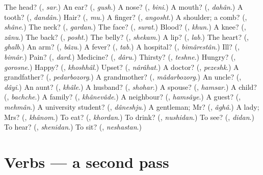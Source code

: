 \begin{tcolorbox}[breakable,colback=teal!4,colframe=teal!35!black,title={Before you move on}]
The head? (\textbf{}, \emph{sar}.) An ear? (\textbf{}, \emph{gush}.) A nose? (\textbf{}, \emph{bini}.) A mouth? (\textbf{}, \emph{dahân}.) A tooth? (\textbf{}, \emph{dandân}.) Hair? (\textbf{}, \emph{mu}.) A finger? (\textbf{}, \emph{angosht}.) A shoulder; a comb? (\textbf{}, \emph{shâne}.) The neck? (\textbf{}, \emph{gardan}.) The face? (\textbf{}, \emph{surat}.) Blood? (\textbf{}, \emph{khun}.) A knee? (\textbf{}, \emph{zânu}.) The back? (\textbf{}, \emph{posht}.) The belly? (\textbf{}, \emph{shekam}.) A lip? (\textbf{}, \emph{lab}.) The heart? (\textbf{}, \emph{ghalb}.) An arm? (\textbf{}, \emph{bâzu}.) A fever? (\textbf{}, \emph{tab}.) A hospital? (\textbf{}, \emph{bimârestân}.) Ill? (\textbf{}, \emph{bimâr}.) Pain? (\textbf{}, \emph{dard}.) Medicine? (\textbf{}, \emph{dâru}.) Thirsty? (\textbf{}, \emph{teshne}.) Hungry? (\textbf{}, \emph{gorosne}.) Happy? (\textbf{}, \emph{khoshhâl}.) Upset? (\textbf{}, \emph{nârâhat}.) A doctor? (\textbf{}, \emph{pezeshk}.) A grandfather? (\textbf{}, \emph{pedarbozorg}.) A grandmother? (\textbf{}, \emph{mâdarbozorg}.) An uncle? (\textbf{}, \emph{dâyi}.) An aunt? (\textbf{}, \emph{khâle}.) A husband? (\textbf{}, \emph{shohar}.) A spouse? (\textbf{}, \emph{hamsar}.) A child? (\textbf{}, \emph{bachche}.) A family? (\textbf{}, \emph{khânevâde}.) A neighbour? (\textbf{}, \emph{hamsâye}.) A guest? (\textbf{}, \emph{mehmân}.) A university student? (\textbf{}, \emph{dâneshju}.) A gentleman; Mr? (\textbf{}, \emph{âghâ}.) A lady; Mrs? (\textbf{}, \emph{khânom}.) To eat? (\textbf{}, \emph{khordan}.) To drink? (\textbf{}, \emph{nushidan}.) To see? (\textbf{}, \emph{didan}.) To hear? (\textbf{}, \emph{shenidan}.) To sit? (\textbf{}, \emph{neshastan}.)
\end{tcolorbox}
\section[(dialogue)]{Verbs — a second pass}

\label{lesson:FA-R44-second-pass-verbs}



